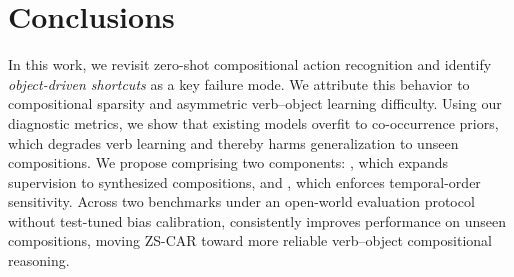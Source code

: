 \section{Conclusions}
\label{sec:conclusions}



In this work, we revisit zero-shot compositional action recognition and identify \emph{object-driven shortcuts} as a key failure mode.
We attribute this behavior to compositional sparsity and asymmetric verb–object learning difficulty.
Using our diagnostic metrics, we show that existing models overfit to co-occurrence priors, which degrades verb learning and thereby harms generalization to unseen compositions.
We propose \ours{} comprising two components: \cpr{}, which expands supervision to synthesized compositions,
and \torc{}, which enforces temporal-order sensitivity.
Across two benchmarks under an open-world evaluation protocol without test-tuned bias calibration, \ours{} consistently improves performance on unseen compositions, 
moving ZS-CAR toward more reliable verb--object compositional reasoning.
